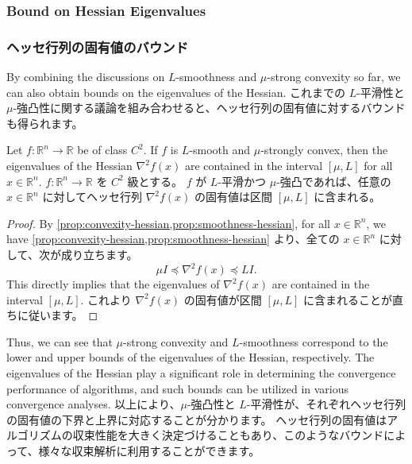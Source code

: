\documentclass[0_main]{subfiles}
\begin{document}
\ifEn
    \subsubsection{Bound on Hessian Eigenvalues}
\else
    \subsubsection{ヘッセ行列の固有値のバウンド}
\fi

\ifEn
    By combining the discussions on $L$-smoothness and $\mu$-strong convexity so far, we can also obtain bounds on the eigenvalues of the Hessian.
\else
    これまでの $L$-平滑性と $\mu$-強凸性に関する議論を組み合わせると、ヘッセ行列の固有値に対するバウンドも得られます。
\fi
\begin{proposition}\label{prop:hessian-eigenvalue-bound}
    \ifEn
        Let $f \colon \mathbb{R}^n \to \mathbb{R}$ be of class $C^2$.
        If $f$ is $L$-smooth and $\mu$-strongly convex, then the eigenvalues of the Hessian $\nabla^2 f(x)$ are contained in the interval $[\mu, L]$ for all $x \in \mathbb{R}^n$.
    \else
        $f \colon \mathbb{R}^n \to \mathbb{R}$ を $C^2$ 級とする。
        $f$ が $L$-平滑かつ $\mu$-強凸であれば、任意の $x \in \mathbb{R}^n$ に対してヘッセ行列 $\nabla^2 f(x)$ の固有値は区間 $[\mu, L]$ に含まれる。
    \fi
\end{proposition}
\begin{proof}
    \ifEn
        By \cref{prop:convexity-hessian,prop:smoothness-hessian}, for all $x \in \mathbb{R}^n$, we have
    \else
        \cref{prop:convexity-hessian,prop:smoothness-hessian} より、全ての $x \in \mathbb{R}^n$ に対して、次が成り立ちます。
    \fi
    \begin{equation*}
        \mu I \preceq \nabla^2 f(x) \preceq L I.
    \end{equation*}
    \ifEn
        This directly implies that the eigenvalues of $\nabla^2 f(x)$ are contained in the interval $[\mu, L]$.
    \else
        これより $\nabla^2 f(x)$ の固有値が区間 $[\mu, L]$ に含まれることが直ちに従います。
    \fi
    \myQED
\end{proof}

\ifEn
    Thus, we can see that $\mu$-strong convexity and $L$-smoothness correspond to the lower and upper bounds of the eigenvalues of the Hessian, respectively.
    The eigenvalues of the Hessian play a significant role in determining the convergence performance of algorithms, and such bounds can be utilized in various convergence analyses.
\else
    以上により、$\mu$-強凸性と $L$-平滑性が、それぞれヘッセ行列の固有値の下界と上界に対応することが分かります。
    ヘッセ行列の固有値はアルゴリズムの収束性能を大きく決定づけることもあり、このようなバウンドによって、様々な収束解析に利用することができます。
\fi
\end{document}
